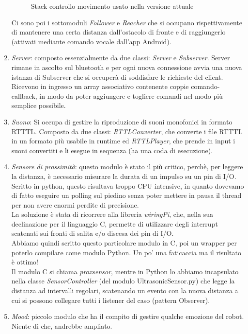 \documentclass[12pt]{article}
\begin{document}
\begin{enumerate}
\begin{figure}[h]
\centering
\caption{Stack controllo movimento usato nella versione attuale}
\label{fig:motion_stack}
\end{figure}
Ci sono poi i sottomoduli \emph{Follower} e \emph{Reacher} che si occupano rispettivamente di mantenere una certa distanza dall'ostacolo di fronte e di raggiungerlo (attivati mediante comando vocale dall'app Android).
\item \emph{Server}: composto essenzialmente da due classi: \emph{Server} e \emph{Subserver}. Server rimane in ascolto sul bluetooth e per ogni nuova connessione avvia una nuova istanza di Subserver che si occuperà di soddisfare le richieste del client.\\
Ricevono in ingresso un array associativo contenente coppie comando-callback, in modo da poter aggiungere e togliere comandi nel modo più semplice possibile.
\item \emph{Suono}: Si occupa di gestire la riproduzione di suoni monofonici in formato RTTTL. Composto da due classi: \emph{RTTLConverter}, che converte i file RTTTL in un formato più usabile in runtime ed \emph{RTTLPlayer}, che prende in input i suoni convertiti e li esegue in sequenza (ha una coda di esecuzione).
\item \emph{Sensore di prossimità}: questo modulo è stato il più critico, perchè, per leggere la distanza, è necessario misurare la durata di un impulso su un pin di I/O. Scritto in python, questo risultava troppo CPU intensive, in quanto dovevamo di fatto eseguire un polling sul piedino senza poter mettere in pausa il thread per non avere enormi perdite di precisione.\\
La soluzione è stata di ricorrere alla libreria \emph{wiringPi}, che, nella sua declinazione per il linguaggio C, permette di utilizzare degli interrupt scatenati sui fronti di salita e/o discesa dei pin di I/O.\\
Abbiamo quindi scritto questo particolare modulo in C, poi un wrapper per poterlo compilare come modulo Python. Un po' una faticaccia ma il risultato è ottimo!\\
Il modulo C si chiama \emph{proxsensor}, mentre in Python lo abbiamo incapsulato nella classe \emph{SensorController} (del modulo UltrasonicSensor.py) che legge la distanza ad intervalli regolari, scatenando un evento con la nuova distanza a cui si possono collegare tutti i listener del caso (pattern Observer).
\item \emph{Mood}: piccolo modulo che ha il compito di gestire qualche emozione del robot. Niente di che, andrebbe ampliato.

\end{enumerate}
\end{document}
